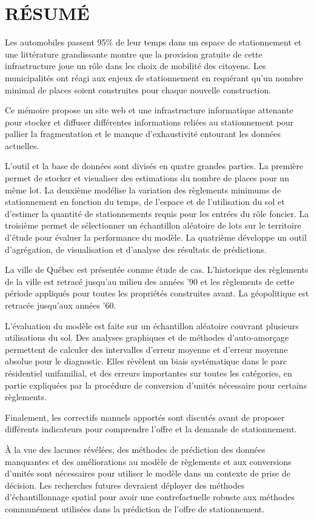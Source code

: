 %
\chapter*{RÉSUMÉ}\thispagestyle{headings}

Les automobiles passent 95\% de leur temps dans un espace de stationnement et une littérature grandissante montre que la provision gratuite de cette infrastructure joue un rôle dans les choix de mobilité des citoyens. Les municipalités ont réagi aux enjeux de stationnement en requérant qu'un nombre minimal de places soient construites pour chaque nouvelle construction.\par

Ce mémoire propose un site web et une infrastructure informatique attenante pour stocker et diffuser différentes informations reliées au stationnement pour pallier la fragmentation et le manque d'exhaustivité entourant les données actuelles.\par

L'outil et la base de données sont divisés en quatre grandes parties. La première permet de stocker et visualiser des estimations du nombre de places pour un même lot. La deuxième modélise la variation des règlements minimums de stationnement en fonction du temps, de l'espace et de l'utilisation du sol et d'estimer la quantité de stationnements requis pour les entrées du rôle foncier. La troisième permet de sélectionner un échantillon aléatoire de lots sur le territoire d'étude pour évaluer la performance du modèle. La quatrième développe un outil d'agrégation, de visualisation et d'analyse des résultats de prédictions. \par

La ville de Québec est présentée comme étude de cas. L'historique des règlements de la ville est retracé jusqu'au milieu des années '90 et les règlements de cette période appliqués pour toutes les propriétés construites avant. La géopolitique est retracée jusqu'aux années '60.\par

L'évaluation du modèle est faite sur un échantillon aléatoire couvrant plusieurs utilisations du sol. Des analyses graphiques et de méthodes d'auto-amorçage permettent de calculer des intervalles d'erreur moyenne et d'erreur moyenne absolue pour le diagnostic. Elles révèlent un biais systématique dans le parc résidentiel unifamilial, et des erreurs importantes sur toutes les catégories, en partie expliquées par la procédure de conversion d'unités nécessaire pour certains règlements.\par

Finalement, les correctifs manuels apportés sont discutés avant de proposer différents indicateurs pour comprendre l'offre et la demande de stationnement. 

À la vue des lacunes révélées, des méthodes de prédiction des données manquantes et des améliorations au modèle de règlements et aux conversions d'unités sont nécessaires pour utiliser le modèle dans un contexte de prise de décision. Les recherches futures devraient déployer des méthodes d'échantillonnage spatial pour avoir une contrefactuelle robuste aux méthodes communément utilisées dans la prédiction de l'offre de stationnement. 